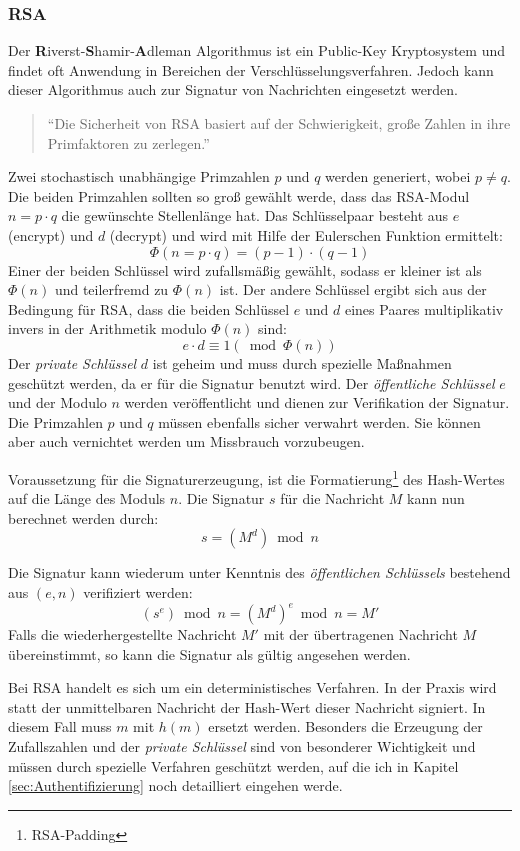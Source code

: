 \documentclass[11pt,a4paper,ngerman]{scrreprt}
\begin{document}
\subsubsection{RSA}
Der \textbf{R}iverst-\textbf{S}hamir-\textbf{A}dleman Algorithmus ist ein Public-Key Kryptosystem und findet oft Anwendung in Bereichen der Verschlüsselungsverfahren. Jedoch kann dieser Algorithmus auch zur Signatur von Nachrichten eingesetzt werden. 
\begin{quote}
    ``Die Sicherheit von RSA basiert auf der Schwierigkeit, große Zahlen in ihre Primfaktoren zu zerlegen.'' \cite[S. 82]{ertel12}
\end{quote}
\begin{description}[font=\rmfamily]
    \item[Schlüsselerzeugung] Zwei stochastisch unabhängige Primzahlen $p$ und $q$ werden generiert, wobei $p \neq q$. Die beiden Primzahlen sollten so groß gewählt werde, dass das RSA-Modul $n=p \cdot q$ die gewünschte Stellenlänge hat. Das Schlüsselpaar besteht aus $e$ (encrypt) und $d$ (decrypt) und wird mit Hilfe der Eulerschen Funktion ermittelt:
    \[
        \Phi(n = p \cdot q) = (p-1) \cdot (q-1)
    \]
    Einer der beiden Schlüssel wird zufallsmäßig gewählt, sodass er kleiner ist als $\Phi(n)$ und teilerfremd zu $\Phi(n)$ ist. Der andere Schlüssel ergibt sich aus der Bedingung für RSA, dass die beiden Schlüssel $e$ und $d$ eines Paares multiplikativ invers in der Arithmetik modulo $\Phi(n)$ sind:
    \[
        e \cdot d \equiv 1 (\bmod \Phi(n)) 
    \]
    Der \emph{private Schlüssel} $d$ ist geheim und muss durch spezielle Maßnahmen geschützt werden, da er für die Signatur benutzt wird. Der \emph{öffentliche Schlüssel} $e$ und der Modulo $n$ werden veröffentlicht und dienen zur Verifikation der Signatur. Die Primzahlen $p$ und $q$ müssen ebenfalls sicher verwahrt werden. Sie können aber auch vernichtet werden um Missbrauch vorzubeugen.
    \item[Signaturerzeugung] Voraussetzung für die Signaturerzeugung, ist die Formatierung\footnote{RSA-Padding} des Hash-Wertes auf die Länge des Moduls $n$. Die Signatur $s$ für die Nachricht $M$ kann nun berechnet werden durch:
    \[
        s = (M^d) \bmod n    
    \]
    \item[Signaturverifikation] Die Signatur kann wiederum unter Kenntnis des \emph{öffentlichen Schlüssels} bestehend aus $(e, n)$ verifiziert werden:
    \[
        (s^e) \bmod n = (M^d)^e \bmod n = M'
    \]
    Falls die wiederhergestellte Nachricht $M'$ mit der übertragenen Nachricht $M$ übereinstimmt, so kann die Signatur als gültig angesehen werden.
    \item[Anmerkungen] Bei RSA handelt es sich um ein deterministisches Verfahren. In der Praxis wird statt der unmittelbaren Nachricht der Hash-Wert dieser Nachricht signiert. In diesem Fall muss $m$ mit $h(m)$ ersetzt werden. Besonders die Erzeugung der Zufallszahlen und der \emph{private Schlüssel} sind von besonderer Wichtigkeit und müssen durch spezielle Verfahren geschützt werden, auf die ich in Kapitel \ref{sec:Authentifizierung} noch detailliert eingehen werde.
\end{description}
\end{document}
